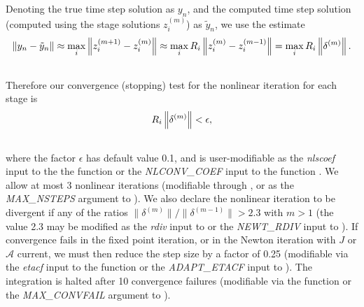 \documentclass[letterpaper,10pt,english]{sphinxmanual}
\begin{document}
Denoting the true time step solution as $y_n$, and the computed
time step solution (computed using the stage solutions
$z_i^{(m)}$) as $\tilde{y}_n$, we use the estimate
\begin{gather}
\begin{split}\left\| y_n - \tilde{y}_n \right\| \approx
\max_i \left\| z_i^{(m+1)} - z_i^{(m)} \right\| \approx
\max_i R_i \left\| z_i^{(m)} - z_i^{(m-1)} \right\| =
\max_i R_i \left\| \delta^{(m)} \right\|.\end{split}\notag\\\begin{split}\end{split}\notag
\end{gather}
Therefore our convergence (stopping) test for the nonlinear iteration
for each stage is
\begin{gather}
\begin{split}R_i \left\|\delta^{(m)} \right\| < \epsilon,\end{split}\notag\\\begin{split}\end{split}\notag
\end{gather}
where the factor $\epsilon$ has default value 0.1, and is
user-modifiable as the \emph{nlscoef} input to the the function
{\hyperref[c_interface/User_callable:ARKodeSetNonlinConvCoef]{}} or the \emph{NLCONV\_COEF} input to the
function {\hyperref[f_interface/Usage:f/_/FARKSETRIN]{}}.  We allow at most 3 nonlinear
iterations (modifiable through {\hyperref[c_interface/User_callable:ARKodeSetMaxNonlinIters]{}}, or
as the \emph{MAX\_NSTEPS} argument to {\hyperref[f_interface/Usage:f/_/FARKSETIIN]{}}).  We also
declare the nonlinear iteration to be divergent if any of the ratios
$\|\delta^{(m)}\| / \|\delta^{(m-1)}\| > 2.3$ with $m>1$
(the value 2.3 may be modified as the \emph{rdiv} input to
{\hyperref[c_interface/User_callable:ARKodeSetNonlinRDiv]{}} or the \emph{NEWT\_RDIV} input to
{\hyperref[f_interface/Usage:f/_/FARKSETRIN]{}}).  If convergence fails in the fixed
point iteration, or in the Newton iteration with $J$ or
${\mathcal A}$ current, we must then reduce the step size by a
factor of 0.25 (modifiable via the \emph{etacf} input to the
{\hyperref[c_interface/User_callable:ARKodeSetMaxCFailGrowth]{}} function or the \emph{ADAPT\_ETACF}
input to {\hyperref[f_interface/Usage:f/_/FARKSETRIN]{}}).  The integration is halted after 10
convergence failures (modifiable via the
{\hyperref[c_interface/User_callable:ARKodeSetMaxConvFails]{}} function or the \emph{MAX\_CONVFAIL}
argument to {\hyperref[f_interface/Usage:f/_/FARKSETIIN]{}}).
\end{document}

